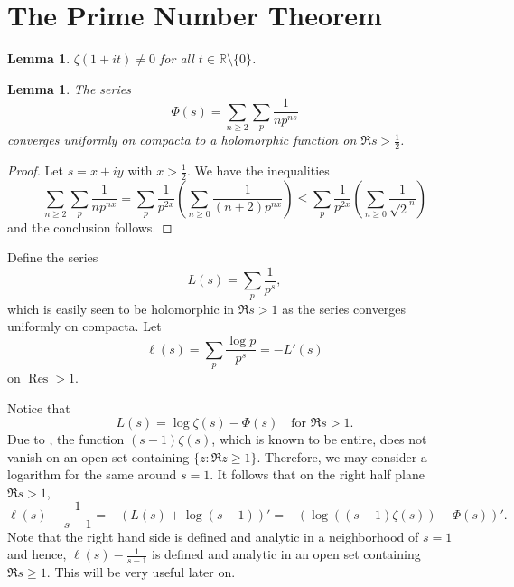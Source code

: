 \documentclass[12pt]{article}
\theoremstyle{thmstyle}
\newtheorem{lemma}[theorem]{Lemma}
\theoremstyle{defstyle}
\newcommand{\R}{\mathbb{R}}
\renewcommand{\le}{\leqslant}
\renewcommand{\ge}{\geqslant}
\newcommand{\Res}{\operatorname{Res}}
\begin{document}
\section{The Prime Number Theorem}

\begin{lemma}
    $\zeta(1 + it)\ne 0$ for all $t\in\R\setminus\{0\}$.
\end{lemma}

\begin{lemma}
    The series 
    \begin{equation*}
        \Phi(s) = \sum_{n\ge 2}\sum_{p}\frac{1}{np^{ns}}
    \end{equation*}
    converges uniformly on compacta to a holomorphic function on $\Re s > \frac{1}{2}$.
\end{lemma}
\begin{proof}
    Let $s = x + iy$ with $x > \frac{1}{2}$. We have the inequalities 
    \begin{equation*}
        \sum_{n\ge 2}\sum_{p}\frac{1}{np^{nx}} = \sum_{p}\frac{1}{p^{2x}}\left(\sum_{n\ge 0}\frac{1}{(n + 2)p^{nx}}\right)\le\sum_{p}\frac{1}{p^{2x}}\left(\sum_{n\ge 0}\frac{1}{\sqrt 2^n}\right)
    \end{equation*}
    and the conclusion follows.
\end{proof}

Define the series 
\begin{equation*}
    L(s) = \sum_{p}\frac{1}{p^s},
\end{equation*}
which is easily seen to be holomorphic in $\Re s > 1$ as the series converges uniformly on compacta. Let 
\begin{equation*}
    \ell(s) = \sum_{p}\frac{\log p}{p^s} = -L'(s)
\end{equation*}
on $\Res > 1$.

Notice that 
\begin{equation*}
    L(s) = \log\zeta(s) - \Phi(s) \quad\text{for }\Re s > 1.
\end{equation*}
Due to , the function $(s - 1)\zeta(s)$, which is known to be entire, does not vanish on an open set containing $\{z\colon\Re z\ge 1\}$. Therefore, we may consider a logarithm for the same around $s = 1$. It follows that on the right half plane $\Re s > 1$,
\begin{equation*}
    \ell(s) - \frac{1}{s - 1} = -\left(L(s) + \log(s - 1)\right)' = -\left(\log\left((s - 1)\zeta(s)\right) - \Phi(s)\right)'.
\end{equation*}
Note that the right hand side is defined and analytic in a neighborhood of $s = 1$ and hence, $\ell(s) - \frac{1}{s - 1}$ is defined and analytic in an open set containing $\Re s\ge 1$. This will be very useful later on.
\end{document}
